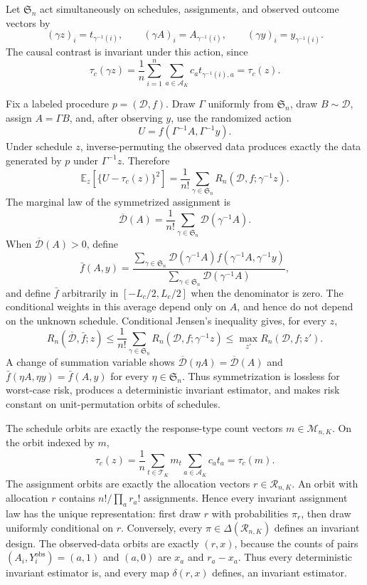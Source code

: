 Let \(\mathfrak S_n\) act simultaneously on schedules, assignments, and observed outcome vectors by
\[
 (\gamma z)_i=t_{\gamma^{-1}(i)},\qquad
 (\gamma A)_i=A_{\gamma^{-1}(i)},\qquad
 (\gamma y)_i=y_{\gamma^{-1}(i)}.
\]
The causal contrast is invariant under this action, since
\[
 \tau_c(\gamma z)
 =\frac1n\sum_{i=1}^n\sum_{a\in\mathcal A_K}c_at_{\gamma^{-1}(i),a}
 =\tau_c(z).
\]

Fix a labeled procedure \(p=(\mathcal D,f)\).  Draw \(\Gamma\) uniformly from \(\mathfrak S_n\), draw \(B\sim\mathcal D\), assign \(A=\Gamma B\), and, after observing \(y\), use the randomized action
\[
 U=f(\Gamma^{-1}A,\Gamma^{-1}y).
\]
Under schedule \(z\), inverse-permuting the observed data produces exactly the data generated by \(p\) under \(\Gamma^{-1}z\).  Therefore
\[
 \mathbb E_z\!\left[\{U-\tau_c(z)\}^2\right]
 =\frac1{n!}\sum_{\gamma\in\mathfrak S_n}
 R_n(\mathcal D,f;\gamma^{-1}z).
\]
The marginal law of the symmetrized assignment is
\[
 \overline{\mathcal D}(A)
 =\frac1{n!}\sum_{\gamma\in\mathfrak S_n}\mathcal D(\gamma^{-1}A).
\]
When \(\overline{\mathcal D}(A)>0\), define
\[
 \bar f(A,y)=
 \frac{\sum_{\gamma\in\mathfrak S_n}\mathcal D(\gamma^{-1}A)
 f(\gamma^{-1}A,\gamma^{-1}y)}
 {\sum_{\gamma\in\mathfrak S_n}\mathcal D(\gamma^{-1}A)},
\]
and define \(\bar f\) arbitrarily in \([-L_c/2,L_c/2]\) when the denominator is zero.  The conditional weights in this average depend only on \(A\), and hence do not depend on the unknown schedule.  Conditional Jensen's inequality gives, for every \(z\),
\[
 R_n(\overline{\mathcal D},\bar f;z)
 \le \frac1{n!}\sum_{\gamma\in\mathfrak S_n}
 R_n(\mathcal D,f;\gamma^{-1}z)
 \le \max_{z'}R_n(\mathcal D,f;z').
\]
A change of summation variable shows
\(\overline{\mathcal D}(\eta A)=\overline{\mathcal D}(A)\) and
\(\bar f(\eta A,\eta y)=\bar f(A,y)\) for every \(\eta\in\mathfrak S_n\).  Thus symmetrization is lossless for worst-case risk, produces a deterministic invariant estimator, and makes risk constant on unit-permutation orbits of schedules.

The schedule orbits are exactly the response-type count vectors \(m\in\mathcal M_{n,K}\).  On the orbit indexed by \(m\),
\[
 \tau_c(z)=\frac1n\sum_{t\in\mathcal T_K}m_t
 \sum_{a\in\mathcal A_K}c_at_a=\tau_c(m).
\]
The assignment orbits are exactly the allocation vectors \(r\in\mathcal R_{n,K}\).  An orbit with allocation \(r\) contains \(n!/\prod_a r_a!\) assignments.  Hence every invariant assignment law has the unique representation: first draw \(r\) with probabilities \(\pi_r\), then draw uniformly conditional on \(r\).  Conversely, every \(\pi\in\Delta(\mathcal R_{n,K})\) defines an invariant design.  The observed-data orbits are exactly \((r,x)\), because the counts of pairs \((A_i,Y_i^{\mathrm{obs}})=(a,1)\) and \((a,0)\) are \(x_a\) and \(r_a-x_a\).  Thus every deterministic invariant estimator is, and every map \(\delta(r,x)\) defines, an invariant estimator.

